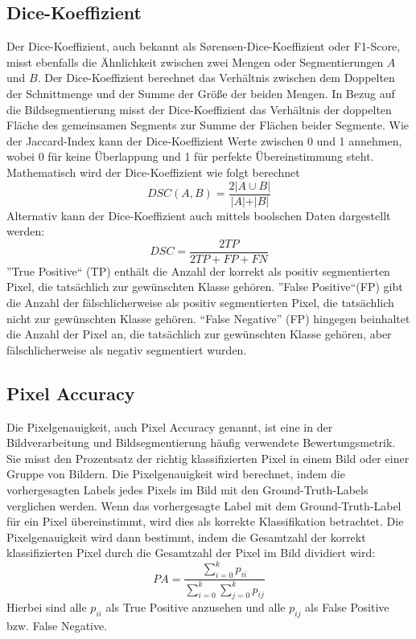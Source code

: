 \subsection{Dice-Koeffizient}
\label{subsec:DiceKoeffizient}
Der Dice-Koeffizient, auch bekannt als Sørensen-Dice-Koeffizient oder F1-Score, misst ebenfalls die Ähnlichkeit zwischen zwei Mengen oder Segmentierungen $A$ und $B$. Der Dice-Koeffizient berechnet das Verhältnis zwischen dem Doppelten der Schnittmenge und der Summe der Größe der beiden Mengen. In Bezug auf die Bildsegmentierung misst der Dice-Koeffizient das Verhältnis der doppelten Fläche des gemeinsamen Segments zur Summe der Flächen beider Segmente. Wie der Jaccard-Index kann der Dice-Koeffizient Werte zwischen 0 und 1 annehmen, wobei 0 für keine Überlappung und 1 für perfekte Übereinstimmung steht. Mathematisch wird der Dice-Koeffizient wie folgt berechnet
\begin{equation}
	DSC(A,B) =  \dfrac{2 \vert A \cup B\vert }{\vert A \vert + \vert B\vert}
\end{equation} 
Alternativ kann der Dice-Koeffizient auch mittels boolschen Daten dargestellt werden:
\begin{equation}
	DSC={\frac {2TP}{2TP+FP+FN}}
\end{equation}
''True Positive`` (TP) enthält die Anzahl der korrekt als positiv segmentierten Pixel, die tatsächlich zur gewünschten Klasse gehören. ''False Positive``(FP) gibt die Anzahl der fälschlicherweise als positiv segmentierten Pixel, die tatsächlich nicht zur gewünschten Klasse gehören. ``False Negative'' (FP) hingegen beinhaltet die Anzahl der Pixel an, die tatsächlich zur gewünschten Klasse gehören, aber fälschlicherweise als negativ segmentiert wurden. \cite[vgl.][]{Dice1945}


\subsection{Pixel Accuracy}
Die Pixelgenauigkeit, auch Pixel Accuracy genannt, ist eine in der Bildverarbeitung und Bildsegmentierung häufig verwendete Bewertungsmetrik. Sie misst den Prozentsatz der richtig klassifizierten Pixel in einem Bild oder einer Gruppe von Bildern.
Die Pixelgenauigkeit wird berechnet, indem die vorhergesagten Labels jedes Pixels im Bild mit den Ground-Truth-Labels verglichen werden. Wenn das vorhergesagte Label mit dem Ground-Truth-Label für ein Pixel übereinstimmt, wird dies als korrekte Klassifikation betrachtet. Die Pixelgenauigkeit wird dann bestimmt, indem die Gesamtzahl der korrekt klassifizierten Pixel durch die Gesamtzahl der Pixel im Bild dividiert wird:
\begin{equation}
	PA = \dfrac{\sum_{i=0}^{k} p_{ii}}{\sum_{i=0}^{k} \sum_{j=0}^{k} p_{ij}}
\end{equation}
Hierbei sind alle $p_{ii}$ als True Positive anzusehen und alle $p_{ij}$ als False Positive bzw. False Negative. \cite[vgl.][]{Hurtado2022}

